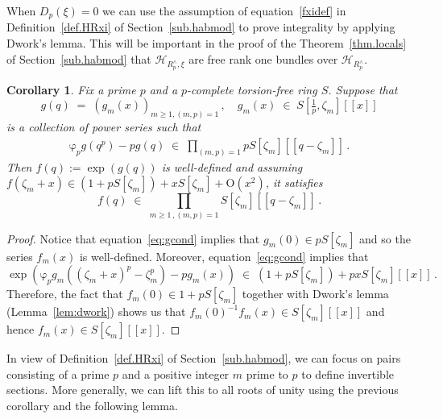 \documentclass[12pt,reqno]{amsart}
\newtheorem{corollary}[proposition]{Corollary}
\theoremstyle{definition}
\def\calH{\mathcal H}
\def\be{\begin{equation}}
\def\ee{\end{equation}}
\def\z{\zeta}
\def\={\;=\;}
\def\inn{\;\in\;}
\def\fr{\mathrm{\varphi}_p}
\begin{document}
When $D_p(\xi)=0$ we can use the assumption of equation~\eqref{fxidef} in
Definition~\ref{def.HRxi} of Section~\ref{sub.habmod} to prove integrality by
applying Dwork's lemma. This will be important in the proof of the
Theorem~\ref{thm.locals} of Section~\ref{sub.habmod} that $\calH_{R_p^\wedge,\xi}$
are free rank one bundles over $\calH_{R_p^\wedge}$.

\begin{corollary}
\label{cor.diagram}
Fix a prime $p$ and a $p$-complete torsion-free ring $S$. Suppose that
\be
g(q)\=(g_m(x))_{m\geq 1,(m,p)=1}\,,
\quad
g_{m}(x)\inn S[\tfrac{1}{p},\z_m][\![x]\!]
\ee
is a collection of power series such that
\be
\label{eq:gcond}
\begin{aligned}
\fr g(q^p) -p g(q)\inn \prod_{(m,p)=1}pS[\z_{m}][\![q-\z_m]\!]\,.
\end{aligned}
\ee
Then $f(q):=\exp(g(q))$ is well-defined and assuming
$f(\z_m+x)\in (1+pS[\z_m])+xS[\z_m]+\mathrm{O}(x^2)$, it satisfies
\be
\label{fintg}
f(q) \inn \prod_{m\geq 1\,,(m,p)=1}S[\z_m][\![q-\z_m]\!]\,.
\ee
\end{corollary}

\begin{proof}
Notice that equation~\eqref{eq:gcond} implies that $g_{m}(0)\in pS[\z_{m}]$
and so the series $f_{m}(x)$ is well-defined.
Moreover, equation~\eqref{eq:gcond} implies that
\be
\exp(\fr g_{m}((\z_{m}+x)^p-\z_{m}^p) -p g_{m}(x))
\inn (1+pS[\z_{m}])+pxS[\z_{m}][\![x]\!]\,.
\ee
Therefore, the fact that $f_{m}(0)\in 1+pS[\z_{m}]$ together with Dwork's lemma
(Lemma~\ref{lem:dwork}) shows us that $f_{m}(0)^{-1}f_{m}(x) \in S[\z_{m}][\![x]\!]$
and hence $f_{m}(x) \in S[\z_{m}][\![x]\!]$.
\end{proof}

In view of Definition~\ref{def.HRxi} of Section~\ref{sub.habmod}, we can focus on
pairs consisting of a prime $p$ and a positive integer $m$ prime to $p$ to define
invertible sections. More generally, we can lift this to all roots of unity using
the previous corollary and the following lemma.
\end{document}
